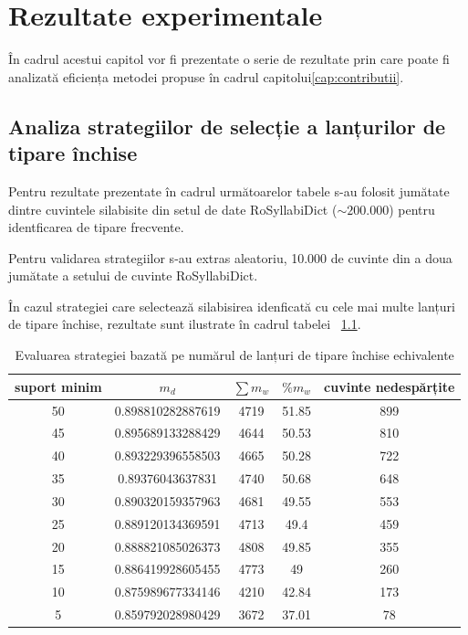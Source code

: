 \chapter{Rezultate experimentale}
\label{cap:rezultate}

În cadrul acestui capitol vor fi prezentate o serie de rezultate prin care poate fi analizată eficiența metodei propuse în cadrul capitolui\ref{cap:contributii}.

\section{Analiza strategiilor de selecție a lanțurilor de tipare închise}

Pentru rezultate prezentate în cadrul următoarelor tabele s-au folosit jumătate dintre cuvintele silabisite din setul de date RoSyllabiDict ($\sim200.000$) pentru identficarea de tipare frecvente. 

Pentru validarea strategiilor s-au extras aleatoriu, 10.000 de cuvinte din a doua jumătate a setului de cuvinte RoSyllabiDict.

În cazul strategiei care selectează silabisirea idenficată cu cele mai multe lanțuri de tipare închise, rezultate sunt ilustrate în cadrul tabelei ~\ref{table:counting}.

\begin{table}[h!]
\centering
\begin{tabular}{|c|c|c|c|c|}
\hline
suport minim & $m_d$ & $\sum m_w$ & $\%{m_w}$ & cuvinte nedespărțite\\ 
\hline
\hline
50 & 0.898810282887619 & 4719 & 51.85 & 899\\ 
\hline
45 & 0.895689133288429 & 4644 & 50.53 & 810\\ 
\hline
40 & 0.893229396558503 & 4665 & 50.28 & 722\\ 
\hline
35 & 0.89376043637831 & 4740 & 50.68 & 648\\ 
\hline
30 & 0.890320159357963 & 4681 & 49.55 & 553\\ 
\hline
25 & 0.889120134369591 & 4713 & 49.4 & 459\\ 
\hline
20 & 0.888821085026373 & 4808 & 49.85 & 355\\ 
\hline
15 & 0.886419928605455 & 4773 & 49 & 260\\ 
\hline
10 & 0.875989677334146 & 4210 & 42.84 & 173\\ 
\hline
5 & 0.859792028980429 & 3672 & 37.01 & 78\\ 
\hline\end{tabular}
\caption{Evaluarea strategiei bazată pe numărul de lanțuri de tipare închise echivalente} 
\label{table:counting}
\end{table}

